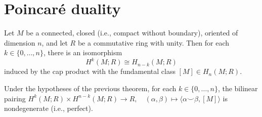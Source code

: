 





\section{Poincar\'e duality}


\begin{theorem}
Let $M$ be a connected, closed (i.e., compact without boundary), oriented  of dimension $n$, and let $R$ be a commutative ring with unity. Then for each $k \in \{0, \ldots, n\}$, there is an isomorphism
$$ H^k(M;R) \cong H_{n-k}(M;R) $$
induced by the cap product with the fundamental class $[M] \in H_n(M;R)$.
\end{theorem}

\begin{theorem}
Under the hypotheses of the previous theorem, for each $k \in \{0, \ldots, n\}$, the bilinear pairing
$
H^k(M;R) \times H^{n-k}(M;R) \to R, \quad (\alpha, \beta) \mapsto \langle \alpha \smile \beta, [M] \rangle
$
is nondegenerate (i.e., perfect).
\end{theorem}

